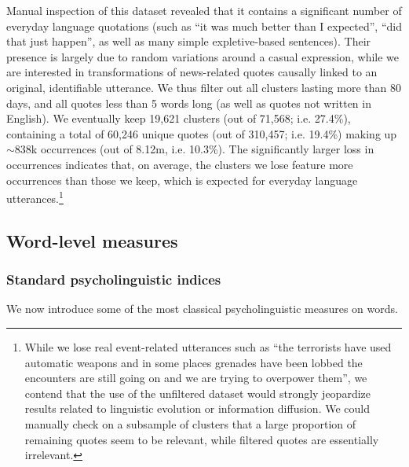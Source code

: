 Manual inspection of this dataset revealed that it contains a significant number of everyday language quotations (such as ``it was much better than I expected'', ``did that just happen'', as well as many simple expletive-based sentences).
Their presence is largely due to random variations around a casual expression, while we are interested in transformations of news-related quotes causally linked to an original, identifiable utterance.
We thus filter out all clusters lasting more than 80 days, and all quotes less than 5 words long %
 (as well as quotes not written in English).
We eventually keep 19,621 clusters (out of 71,568; i.e. 27.4\%), containing a total of 60,246 unique quotes (out of 310,457; i.e. 19.4\%) making up $\sim$838k occurrences (out of 8.12m, i.e. 10.3\%).
The significantly larger loss in occurrences indicates that, on average, the clusters we lose feature more occurrences than those we keep, which is expected for everyday language utterances.\footnote{While we lose real event-related utterances such as ``the terrorists have used automatic weapons and in some places grenades have been lobbed the encounters are still going on and we are trying to overpower them'', we contend that the use of the unfiltered dataset would strongly jeopardize results related to linguistic evolution or information diffusion. We could manually check on a subsample of clusters that a large proportion of remaining quotes seem to be relevant, while filtered quotes are essentially irrelevant.}

\subsection{Word-level measures}


\subsubsection{Standard psycholinguistic indices}

We now introduce some of the most classical psycholinguistic measures on words.

